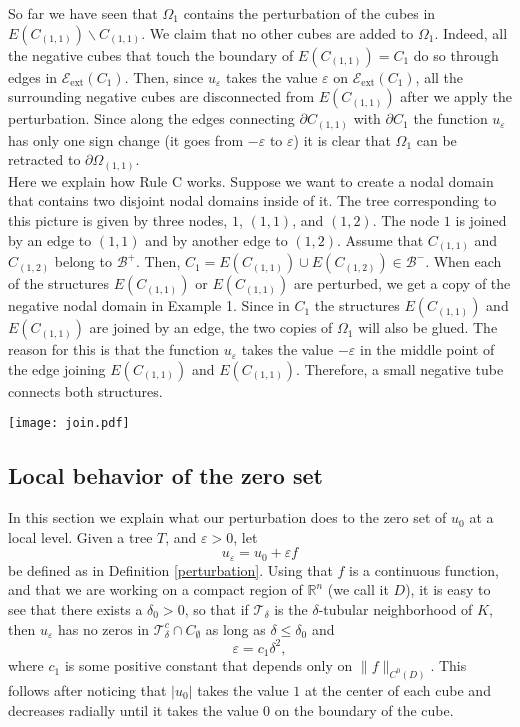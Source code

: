 \documentclass[11pt,reqno]{amsart}
\newcommand{\R}{{\mathbb R}}
\newcommand{\ep}{\varepsilon}
\theoremstyle{definition}
\begin{document}
 
So far we have seen that $\Omega_1$ contains  the perturbation of  the cubes in $E(C_{(1,1)}) \backslash C_{(1,1)}$. We claim that no other cubes are added to $\Omega_1$. Indeed, all the negative cubes that touch the boundary of  $E(C_{(1,1)}) =C_1$ do so through edges in  $\mathcal E_{\text{ext}} (C_{1})$. Then, since $u_\ep$ takes the value $\ep$ on  $\mathcal E_{\text{ext}} (C_{1})$, all the surrounding negative cubes are disconnected from $E(C_{(1,1)})$ after we apply the perturbation. Since along the edges connecting $\partial C_{(1,1)}$ with $\partial C_{1}$ the function $u_\ep$ has only one sign change (it goes from $-\ep$ to $\ep$) it is clear that $\Omega_1$ can be retracted to $\partial \Omega_{(1,1)}$.\\



 Here we explain how Rule C works. Suppose we want to create a nodal domain that contains two disjoint nodal domains inside of it. The tree corresponding to this picture is given by three nodes, $1$, $(1,1)$, and $(1,2)$. The node $1$ is joined by an edge to  $(1,1)$ and by another edge to $(1,2)$.  Assume that $C_{(1,1)}$ and $C_{(1,2)}$ belong to $\mathcal B^+$.
Then, $C_1=E(C_{(1,1)}) \cup E(C_{(1,2)}) \in \mathcal B^-$.  When each of the structures $E(C_{(1,1)}) $ or $E(C_{(1,1)}) $ are perturbed, we get a copy of the negative nodal domain in Example 1. Since in $C_1$ the structures $E(C_{(1,1)}) $ and  $E(C_{(1,1)}) $  are joined by an edge, the two copies of $\Omega_1$ will also be glued. The reason for this is that the function $u_\ep$ takes the value $-\ep$ in the middle point of the edge joining $E(C_{(1,1)}) $ and  $E(C_{(1,1)}) $. Therefore,  a small negative tube connects both structures.

 \begin{center}
\texttt{[image: join.pdf]}
 \end{center}


\subsection{Local behavior of the zero set}\label{local}
In this section we explain what our perturbation does to the zero set of $u_0$ at a local level. Given a tree $T$, and $\ep>0$,  let \[u_\ep = u_0 + \ep f\] be defined as in Definition \ref{perturbation}.
Using that $f$ is a continuous function, and that we are working on a compact region of $\R^n$ (we call it $D$), it is easy to see that   there exists a  $\delta_0>0$, so that if $\mathcal T_\delta$ is the $\delta$-tubular neighborhood  of $K$, then  $u_\ep$ has no zeros in $\mathcal T_\delta^c \cap C_\emptyset$ as long as $\delta \leq \delta_0$ and  
$$\ep =c_1 \delta^2,$$ where $c_1$ is some positive constant that depends only on $\|f\|_{C^0(D)}$. This follows after noticing that $|u_0|$ takes the value $1$ at the center of each cube and decreases radially until it takes the value $0$ on the boundary of the cube.   
\end{document}

